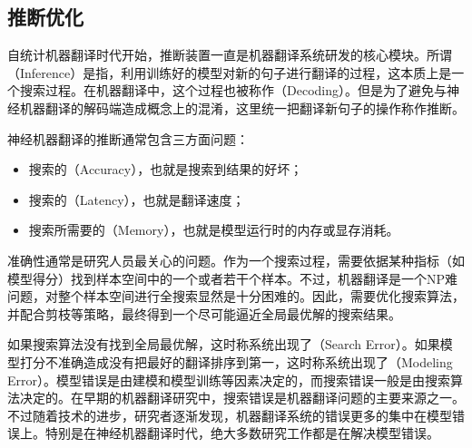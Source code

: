 
\subsection{推断优化}

\parinterval 自统计机器翻译时代开始，推断装置一直是机器翻译系统研发的核心模块。所谓{\small{}}（Inference）是指，利用训练好的模型对新的句子进行翻译的过程，这本质上是一个搜索过程。在机器翻译中，这个过程也被称作{\small{}}（Decoding）。但是为了避免与神经机器翻译的解码端造成概念上的混淆，这里统一把翻译新句子的操作称作推断。

\parinterval 神经机器翻译的推断通常包含三方面问题：

\begin{itemize}
\vspace{0.5em}
\item 搜索的{\small{}}（Accuracy），也就是搜索到结果的好坏；
\vspace{0.5em}
\item 搜索的{\small{}}（Latency），也就是翻译速度；
\vspace{0.5em}
\item 搜索所需要的{\small{}}（Memory），也就是模型运行时的内存或显存消耗。
\vspace{0.5em}
\end{itemize}

\parinterval 准确性通常是研究人员最关心的问题。作为一个搜索过程，需要依据某种指标（如模型得分）找到样本空间中的一个或者若干个样本。不过，机器翻译是一个NP难问题，对整个样本空间进行全搜索显然是十分困难的\cite{knight1999decoding}。因此，需要优化搜索算法，并配合剪枝等策略，最终得到一个尽可能逼近全局最优解的搜索结果。

如果搜索算法没有找到全局最优解，这时称系统出现了{\small{}}（Search Error）。如果模型打分不准确造成没有把最好的翻译排序到第一，这时称系统出现了{\small{}}（Modeling Error）。模型错误是由建模和模型训练等因素决定的，而搜索错误一般是由搜索算法决定的。在早期的机器翻译研究中，搜索错误是机器翻译问题的主要来源之一。不过随着技术的进步，研究者逐渐发现，机器翻译系统的错误更多的集中在模型错误上\cite{DBLP:conf/emnlp/StahlbergB19}。特别是在神经机器翻译时代，绝大多数研究工作都是在解决模型错误。


